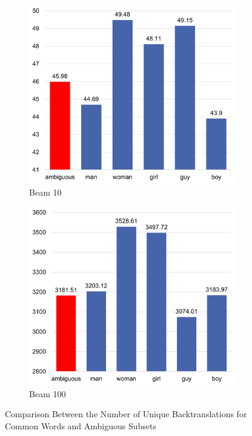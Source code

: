 \begin{figure}[!htb]
     \centering
     
     \begin{subfigure}{0.49\textwidth}
         \centering
         \includegraphics[width=\textwidth]{figures/uniqueness/range_beam_10.png}
         \caption{Beam 10}
         \label{fig:uniqueness_range_10}
     \end{subfigure}
     \hfill
     \begin{subfigure}{0.49\textwidth}
         \centering
         \includegraphics[width=\textwidth]{figures/uniqueness/range_beam_100.png}
         \caption{Beam 100}
         \label{fig:uniqueness_range_100}
     \end{subfigure}
     
    \caption{Comparison Between the Number of Unique Backtranslations for Common Words and Ambiguous Subsets}
    \label{fig:uniqueness_range}

\end{figure}


